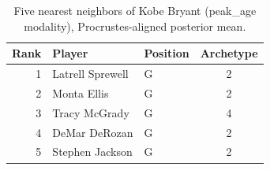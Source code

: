 \begin{table}[htbp]
  \centering\small
  \begin{tabular}{rllc}
    \toprule
    Rank & Player & Position & Archetype \\
    \midrule
    1 & Latrell Sprewell & G & 2 \\
    2 & Monta Ellis & G & 2 \\
    3 & Tracy McGrady & G & 4 \\
    4 & DeMar DeRozan & G & 2 \\
    5 & Stephen Jackson & G & 2 \\
    \bottomrule
  \end{tabular}
  \caption{Five nearest neighbors of Kobe Bryant (peak_age modality), Procrustes-aligned posterior mean.}
  \label{tab:Kobe_Bryant_neighbors_peak_age}
\end{table}

